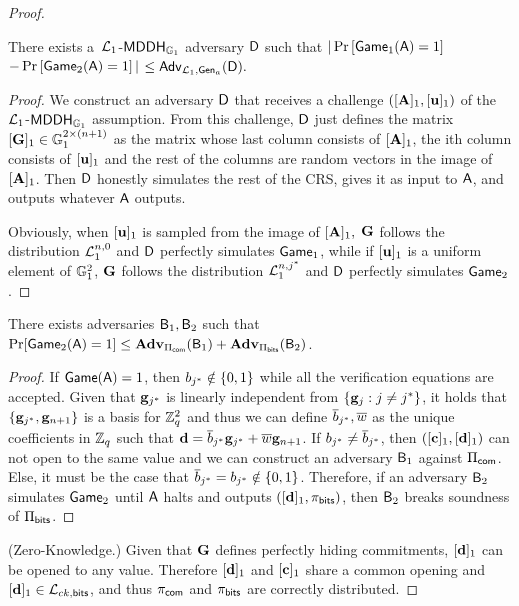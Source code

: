 \begin{proof}
\begin{lemma} There exists a\ $\mathcal{L}_1$-$\mathsf{MDDH}_{\mathbb{G}_1}$ adversary $\mathsf{D}$ such that
$|\Pr\left[\mathsf{Game}_{1}(\mathsf{A})=1\right]$ $-\Pr\left[\mathsf{Game}_{2}(\mathsf{A})=1\right]|$ $\leq
    \mathsf{Adv}_{\mathcal{L}_1,\mathsf{Gen}_a}(\mathsf{D}).$
\end{lemma}
\begin{proof}
We construct an adversary $\mathsf{D}$ that receives 
a challenge $([\mathbf{{A}}]_1,[\mathbf{u}]_1)$ of the 
$\mathcal{L}_1$-$\mathsf{MDDH}_{\mathbb{G}_1}$ assumption. From this challenge, $\mathsf{D}$ just defines the matrix  $[{\mathbf{{G}}}]_1\in\mathbb{G}_1^{2\times(n+1)}$ as the matrix whose last column consists of $[\mathbf{{A}}]_1$, the ith column consists of $[\mathbf{u}]_1$ and the rest of the columns are random vectors in the image of $[\mathbf{{A}}]_1$. Then $\mathsf{D}$ honestly simulates the rest of the CRS, gives it as input to $\mathsf{A}$, and outputs whatever $\mathsf{A}$ outputs.

Obviously, when $[\mathbf{u}]_1$ is sampled from 
the image of $[\mathbf{{A}}]_1,$ $\mathbf{{G}}$ follows the distribution $\mathcal{L}_1^{n,0}$ and $\mathsf{D}$ perfectly simulates $\mathsf{Game}_1$, while if $[\mathbf{u}]_1$ is a uniform element of $\mathbb{G}^2_1$, ${\mathbf{{G}}}$ follows the distribution $\mathcal{L}_1^{n,j^*}$ and $\mathsf{D}$ perfectly simulates $\mathsf{Game}_2$. 
\end{proof}

\begin{lemma}
There exists adversaries $\mathsf{B}_1,\mathsf{B}_2$ such that $\Pr[\mathsf{Game}_2(\mathsf{A})=1]\leq\mathbf{Adv}_{\Pi_{\mathsf{com}}}(\mathsf{B}_1)+\mathbf{Adv}_{\Pi_{\mathsf{bits}}}(\mathsf{B}_2)$.
\end{lemma}

\begin{proof}
If $\mathsf{Game}(\mathsf{A})=1$, then $b_{j^*}\notin\{0,1\}$ while all the verification equations are accepted. Given that $\mathbf{g}_{j^*}$ is linearly independent from $\{\mathbf{g}_j:j\neq j^*\}$, it holds that $\{\mathbf{g}_{j^*},\mathbf{g}_{n+1}\}$ is a basis for $\mathbb{Z}_q^2$ and thus we can define $\overline{b}_{j^*},\overline{w}$ as the unique coefficients in $\mathbb{Z}_q$ such that $\mathbf{d} = \overline{b}_{j^*}\mathbf{g}_{j^*}+\overline{w}\mathbf{g}_{n+1}$. If $b_{j^*}\neq\overline{b}_{j^*}$, then $([\mathbf{c}]_1,[\mathbf{d}]_1)$ can not open to the same value and we can construct an adversary $\mathsf{B}_1$ against $\Pi_{\mathsf{com}}$. Else, it must be the case that $\overline{b}_{j^*}=b_{j^*}\notin\{0,1\}$. Therefore, if an adversary $\mathsf{B}_2$ simulates $\mathsf{Game}_2$ until $\mathsf{A}$ halts and outputs $([\mathbf{d}]_1,\pi_{\mathsf{bits}})$, then $\mathsf{B}_2$ breaks soundness of $\Pi_{\mathsf{bits}}$.
\end{proof}

(Zero-Knowledge.) Given that $\mathbf{{G}}$ defines perfectly hiding commitments, $[\mathbf{d}]_1$ can be opened to any value. Therefore $[\mathbf{d}]_1$ and $[\mathbf{c}]_1$ share a common opening and $[\mathbf{d}]_1\in\mathcal{L}_{{ck},\mathsf{bits}}$, and thus $\pi_{\mathsf{com}}$ and $\pi_{\mathsf{bits}}$ are correctly distributed.  
\end{proof}


